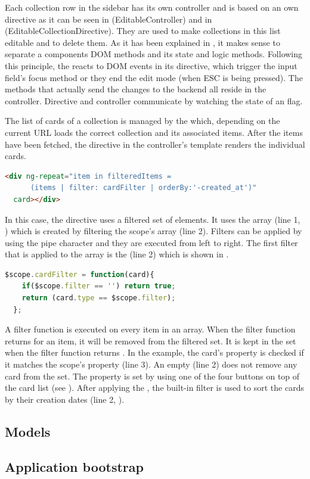 Each collection row in the sidebar has its own controller and is based on an own directive as it can be seen in  (EditableController) and in  (EditableCollectionDirective). They are used to make collections in this list editable and to delete them. As it has been explained in , it makes sense to separate a components DOM methods and its state and logic methods. Following this principle, the  reacts to DOM events in its directive, which trigger the input field's focus method or they end the edit mode (when ESC is being pressed). The methods that actually send the changes to the backend all reside in the controller. Directive and controller communicate by watching the state of an  flag.

The list of cards of a collection is managed by the  which, depending on the current URL loads the correct collection and its associated items. After the items have been fetched, the  directive in the controller's template renders the individual cards.

\begin{lstlisting}[language=HTML, caption=CardListController template, label=lst:cardlist-template]
  <div ng-repeat="item in filteredItems = 
      (items | filter: cardFilter | orderBy:'-created_at')"
  card></div>
\end{lstlisting}

In this case, the  directive uses a filtered set of elements. It uses the  array (line 1, ) which is created by filtering the scope's  array (line 2). Filters can be applied by using the pipe character and they are executed from left to right. The first filter that is applied to the  array is the  (line 2) which is shown in .

\begin{lstlisting}[language=JavaScript, caption=CardListController filter, label=lst:cardlist-filter]
  $scope.cardFilter = function(card){
    if($scope.filter == '') return true;
    return (card.type == $scope.filter);
  };
\end{lstlisting}

A filter function is executed on every item in an array. When the filter function returns  for an item, it will be removed from the filtered set. It is kept in the set when the filter function returns . In the  example, the card's  property is checked if it matches the scope's  property (line 3). An empty  (line 2) does not remove any card from the set. The  property is set by using one of the four buttons on top of the card list (see ). After applying the , the built-in  filter is used to sort the cards by their creation dates (line 2, ).

\subsection{Models}

\subsection{Application bootstrap}